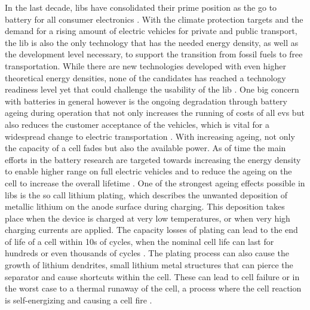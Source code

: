 
In the last decade, \glspl{lib} have consolidated their prime position as the go to battery for all consumer electronics \cite{Zubi.2018}. With the climate protection targets and the demand for a rising amount of electric vehicles for private and public transport, the \gls{lib} is also the only technology that has the needed energy density, as well as the development level necessary, to support the transition from fossil fuels to  free transportation. While there are new technologies developed with even higher theoretical energy densities, none of the candidates has reached a technology readiness level yet that could challenge the usability of the \gls{lib} \cite{Placke.2017}. One big concern with batteries in general however is the ongoing degradation through battery ageing during operation that not only increases the running of costs of all \glspl{ev} but also reduces the customer acceptance of the vehicles, which is vital for a widespread change to electric transportation \cite{Agubra.2013}. With increasing ageing, not only the capacity of a cell fades but also the available power. As of time the main efforts in the battery research are targeted towards increasing the energy density to enable higher range on full electric vehicles and to reduce the ageing on the cell to increase the overall lifetime \cite{Vetter.2005,Lin.2015}. One of the strongest ageing effects possible in \gls{lib}s is the so call lithium plating, which describes the unwanted deposition of metallic lithium on the anode surface during charging. This deposition takes place when the device is charged at very low temperatures, or when very high charging currents are applied. The capacity losses of plating can lead to the end of life of a cell within 10s of cycles, when the nominal cell life can last for hundreds or even thousands of cycles \cite{JiangFan.2006}. The plating process can also cause the growth of lithium dendrites, small lithium metal structures that can pierce the separator and cause shortcuts within the cell. These can lead to cell failure or in the worst case to a thermal runaway of the cell, a process where the cell reaction is self-energizing and causing a cell fire \cite{Waldmann.2018}.  \par
